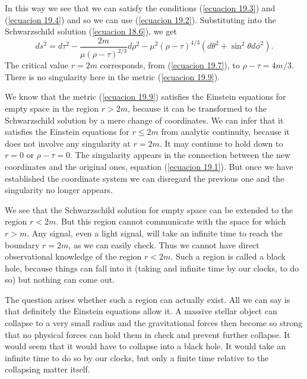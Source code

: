 In this way we see that we can satisfy the conditions (\ref{ecuacion 19.3}) and (\ref{ecuacion 19.4}) and so we can use 
(\ref{ecuacion 19.2}). Substituting into the Schwarzschild solution (\ref{ecuacion 18.6}), we get
\begin{equation}
 \label{ecuacion 19.9}
 ds^2 = d\tau^2 - \frac{2 m}{\mu (\rho - \tau)^{2/3}} d\rho^2 - \mu^2 (\rho - \tau)^{4/3}
 \left( d\theta^2 + \sin^2 \theta d\phi^2 \right).
\end{equation}
The critical value $r = 2 m$ corresponds, from (\ref{ecuacion 19.7}), to $\rho - \tau = 4 m/3$. There is no singularity 
here in the metric (\ref{ecuacion 19.9}).

We know that the metric (\ref{ecuacion 19.9}) satisfies the Einstein equations for empty space in the region $r > 2m$, 
because it can be transformed to the Schwarzschild solution by a mere change of coordinates. We can  infer that it 
satisfies the Einstein equations for $r \le 2m $ from analytic continuity, because it does not involve any singularity 
at $r=2m$. It may continue to hold down to $r=0$ or $\rho - \tau = 0$. The singularity appears in the connection 
between the new coordinates and the original ones, equation (\ref{ecuacion 19.1}). But once we have established the 
coordinate system we can disregard the previous one and the singularity no longer appears.

We see that the Schwarzschild solution for empty space can be extended to the region $r<2m$. But this region cannot 
communicate with the space for which $r>m$. Any signal, even a light signal, will take an infinite time to reach the 
boundary $r=2m$, as we can easily check. Thus we cannot have direct observational knowledge of the region $r < 2m$. 
Such a region is called a black hole, because things can fall into it (taking and infinite time by our clocks, to do 
so) but nothing can come out.

The question arises whether such a region can actually exist. All we can say is that definitely the Einstein equations 
allow it. A massive stellar object can collapse to a very small radius and the gravitational forces then become so 
strong that no physical forces can hold them in check and prevent further collapse. It would seem that it would have to 
collapse into a black hole. It would take an infinite time to do so by our clocks, but only a finite time relative to 
the collapsing matter itself.






